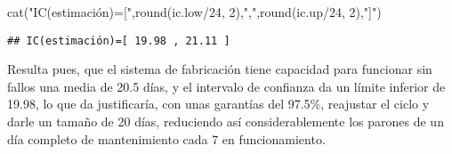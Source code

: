 \documentclass[
]{book}
\newenvironment{Shaded}{\begin{snugshade}}{\end{snugshade}}
\newcommand{\DecValTok}[1]{\textcolor[rgb]{0.00,0.00,0.81}{#1}}
\newcommand{\FunctionTok}[1]{\textcolor[rgb]{0.00,0.00,0.00}{#1}}
\newcommand{\NormalTok}[1]{#1}
\newcommand{\SpecialCharTok}[1]{\textcolor[rgb]{0.00,0.00,0.00}{#1}}
\newcommand{\StringTok}[1]{\textcolor[rgb]{0.31,0.60,0.02}{#1}}
\theoremstyle{definition}
\theoremstyle{definition}
\theoremstyle{definition}
\theoremstyle{definition}
\theoremstyle{remark}
\begin{document}
\begin{Shaded}
\begin{Highlighting}[]
\FunctionTok{cat}\NormalTok{(}\StringTok{"IC(estimación)=["}\NormalTok{,}\FunctionTok{round}\NormalTok{(ic.low}\SpecialCharTok{/}\DecValTok{24}\NormalTok{, }\DecValTok{2}\NormalTok{),}\StringTok{","}\NormalTok{,}\FunctionTok{round}\NormalTok{(ic.up}\SpecialCharTok{/}\DecValTok{24}\NormalTok{, }\DecValTok{2}\NormalTok{),}\StringTok{"]"}\NormalTok{)}
\end{Highlighting}
\end{Shaded}

\begin{verbatim}
## IC(estimación)=[ 19.98 , 21.11 ]
\end{verbatim}

Resulta pues, que el sistema de fabricación tiene capacidad para funcionar sin fallos una media de 20.5 días, y el intervalo de confianza da un límite inferior de 19.98, lo que da justificaría, con unas garantías del 97.5\%, reajustar el ciclo y darle un tamaño de 20 días, reduciendo así considerablemente los parones de un día completo de mantenimiento cada 7 en funcionamiento.
\end{document}
